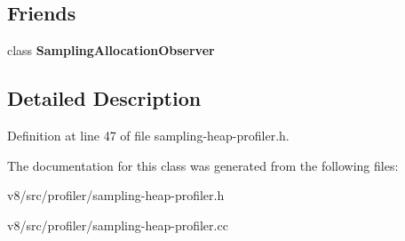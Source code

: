 \subsection*{Friends}
\begin{DoxyCompactItemize}
\item 
\mbox{\label{classv8_1_1internal_1_1SamplingHeapProfiler_ab72eef16330b03793259e4fd1446dc8d}} 
class {\bfseries Sampling\+Allocation\+Observer}
\end{DoxyCompactItemize}


\subsection{Detailed Description}


Definition at line 47 of file sampling-\/heap-\/profiler.\+h.



The documentation for this class was generated from the following files\+:\begin{DoxyCompactItemize}
\item 
v8/src/profiler/sampling-\/heap-\/profiler.\+h\item 
v8/src/profiler/sampling-\/heap-\/profiler.\+cc\end{DoxyCompactItemize}
